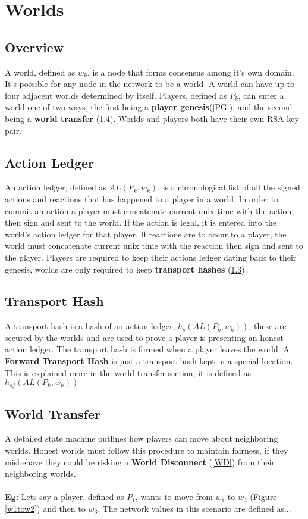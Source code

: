 \documentclass[runningheads,a4paper]{llncs}
\begin{document}
\section{Worlds}
\subsection{Overview}
A world, defined as $w_k$, is a node that forms consensus among it's own domain. It's possible for any node in the network to be a world. A world can have up to four adjacent worlds determined by itself. Players, defined as $P_k$, can enter a world one of two ways, the first being a \textbf{player genesis}(\ref{PG}), and the second being a \textbf{world transfer} (\ref{WT}). Worlds and players both have their own RSA key pair. 


\subsection{Action Ledger}
\label{AL}
An action ledger, defined as $AL(P_{k}, w_k)$, is a chronological list of all the signed actions and reactions that has happened to a player in a world. In order to commit an action a player must concatenate current unix time with the action, then sign and sent to the world. If the action is legal, it is entered into the world's action ledger for that player. If reactions are to occur to a player, the world must concatenate current unix time with the reaction then sign and sent to the player. Players are required to keep their actions ledger dating back to their genesis, worlds are only required to keep \textbf{transport hashes} (\ref{TH}).

\subsection{Transport Hash}
\label{TH}
A transport hash is a hash of an action ledger, $h_s(AL(P_{k}, w_k))$, these are secured by the worlds and are used to prove a player is presenting an honest action ledger. The transport hash is formed when a player leaves the world. A \textbf{Forward Transport Hash} is just a transport hash kept in a special location. This is explained more in the world transfer section, it is defined as  $h_{sf}(AL(P_{k}, w_k))$

\subsection{World Transfer} 
\label{WT}
A detailed state machine outlines how players can move about neighboring worlds. Honest worlds must follow this procedure to maintain fairness, if they misbehave they could be risking a \textbf{World Disconnect} (\ref{WD}) from their neighboring worlds. 
\\
\\
\textbf{Eg:} Lets say a player, defined as $P_1$, wants to move from $w_1$ to $w_2$ (Figure \ref{w1tow2}) and then to $w_3$, The network values in this scenario are defined as...
\end{document}
